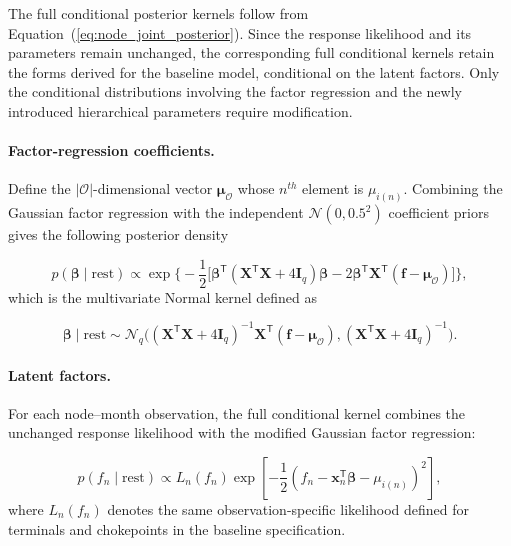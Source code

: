 \documentclass[pdftex,12pt,openright,a4paper,oneside]{book}
\begin{document}
The full conditional posterior kernels follow
from Equation~(\ref{eq:node_joint_posterior}).
Since the response likelihood and its parameters
remain unchanged, the corresponding full conditional kernels
retain the forms derived for the baseline
model, conditional on the latent factors.
Only the conditional distributions involving
the factor regression and the newly introduced
hierarchical parameters require modification.

\paragraph{Factor-regression coefficients.}

Define the $|\mathcal{O}|$-dimensional vector
$\boldsymbol{\mu}_{\mathcal{O}}$ whose $n^{th}$ element
is $\mu_{i(n)}$.
Combining the Gaussian factor regression with the independent
$\mathcal{N}(0,0.5^2)$ coefficient priors gives the following posterior density

\begin{equation}
p(\boldsymbol{\beta}\mid\mathrm{rest})
\propto
\exp\Bigg\{-\frac12\Big[
\boldsymbol{\beta}^{\mathsf T}
(\mathbf{X}^{\mathsf T}\mathbf{X}+4\mathbf{I}_q)
\boldsymbol{\beta}
-2\boldsymbol{\beta}^{\mathsf T}
\mathbf{X}^{\mathsf T}
(\mathbf{f}-\boldsymbol{\mu}_{\mathcal{O}})
\Big]\Bigg\},
\label{eq:node_fc_beta_kernel}
\end{equation}
which is the multivariate Normal kernel defined as

\begin{equation}
\boldsymbol{\beta}\mid\mathrm{rest}
\sim\mathcal{N}_q\Big(
(\mathbf{X}^{\mathsf T}\mathbf{X}
+4\mathbf{I}_q)^{-1}
\mathbf{X}^{\mathsf T}
(\mathbf{f}-\boldsymbol{\mu}_{\mathcal{O}}),
(\mathbf{X}^{\mathsf T}\mathbf{X}
+4\mathbf{I}_q)^{-1}
\Big).
\label{eq:node_fc_beta_normal}
\end{equation}

\paragraph{Latent factors.}

For each node--month observation, the full conditional
kernel combines the unchanged response likelihood
with the modified Gaussian factor regression:

\begin{equation}
p(f_n\mid\mathrm{rest})
\propto
L_n(f_n)
\exp\left[
-\frac12
\left(
f_n-\boldsymbol{x}_n^{\mathsf T}
\boldsymbol{\beta}
-\mu_{i(n)}
\right)^2
\right],
\label{eq:node_fc_factor}
\end{equation}
where $L_n(f_n)$ denotes the same observation-specific
likelihood defined for terminals and chokepoints
in the baseline specification.
\end{document}
